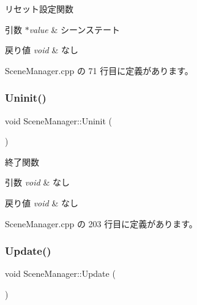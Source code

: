 リセット設定関数 


\begin{DoxyParams}{引数}
{\em $\ast$value} & シーンステート \\
\hline
\end{DoxyParams}

\begin{DoxyRetVals}{戻り値}
{\em void} & なし \\
\hline
\end{DoxyRetVals}


 Scene\+Manager.\+cpp の 71 行目に定義があります。

\mbox{\label{class_scene_manager_ae3ff21f2261fc50f1e860cf7fc3a2108}} 
\subsubsection{\texorpdfstring{Uninit()}{Uninit()}}
{\footnotesize\ttfamily void Scene\+Manager\+::\+Uninit (\begin{DoxyParamCaption}{ }\end{DoxyParamCaption})}



終了関数 


\begin{DoxyParams}{引数}
{\em void} & なし \\
\hline
\end{DoxyParams}

\begin{DoxyRetVals}{戻り値}
{\em void} & なし \\
\hline
\end{DoxyRetVals}


 Scene\+Manager.\+cpp の 203 行目に定義があります。

\mbox{\label{class_scene_manager_a63dcf65832d6a2c190bf496d9a3b00a3}} 
\subsubsection{\texorpdfstring{Update()}{Update()}}
{\footnotesize\ttfamily void Scene\+Manager\+::\+Update (\begin{DoxyParamCaption}{ }\end{DoxyParamCaption})}



